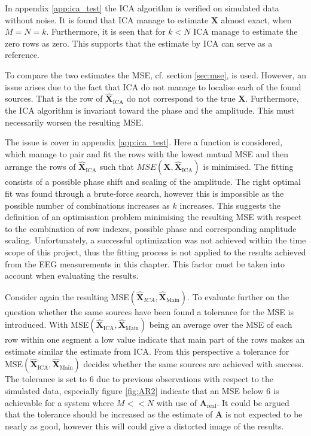 In appendix \ref{app:ica_test} the ICA algorithm is verified on simulated data without noise. 
It is found that ICA manage to estimate $\textbf{X}$ almost exact, when $M=N=k$. 
Furthermore, it is seen that for $k < N$ ICA manage to estimate the zero rows as zero. This supports that the estimate by ICA can serve as a reference.     

To compare the two estimates the MSE, cf. section \ref{sec:mse}, is used. 
However, an issue arises due to the fact that ICA do not manage to localise each of the found sources. 
That is the row of $\hat{\textbf{X}}_{\text{ICA}}$ do not correspond to the true $\textbf{X}$. 
Furthermore, the ICA algorithm is invariant toward the phase and the amplitude. This must necessarily worsen the resulting MSE.  

The issue is cover in appendix \ref{app:ica_test}. 
Here a function is considered, which manage to pair and fit the rows with the lowest mutual MSE and then arrange the rows of $\hat{\textbf{X}}_{\text{ICA}}$ such that $MSE(\textbf{X},\hat{\textbf{X}}_{\text{ICA}})$ is minimised. 
The fitting consists of a possible phase shift and scaling of the amplitude. 
The right optimal fit was found through a brute-force search, however this is impossible as the possible number of combinations increases as $k$ increases. 
This suggests the definition of an optimisation problem minimising the resulting MSE with respect to the combination of row indexes, possible phase and corresponding amplitude scaling. 
Unfortunately, a successful optimization was not achieved within the time scope of this project, thus the fitting process is not applied to the results achieved from the EEG measurements in this chapter. 
This factor must be taken into account when evaluating the results.

Consider again the resulting MSE$(\hat{\textbf{X}}_{ICA},\hat{\textbf{X}}_{\text{Main}})$. 
To evaluate further on the question whether the same sources have been found a tolerance for the MSE is introduced. 
With MSE$(\hat{\textbf{X}}_{\text{ICA}},\hat{\textbf{X}}_{\text{Main}})$ being an average over the MSE of each row within one segment a low value indicate that main part of the rows makes an estimate similar the estimate from ICA. 
From this perspective a tolerance for MSE$(\hat{\textbf{X}}_{\text{ICA}},\hat{\textbf{X}}_{\text{Main}})$ decides whether the same sources are achieved with success. 
The tolerance is set to 6 due to previous observations with respect to the simulated data, especially figure \ref{fig:AR2} indicate that an MSE below 6 is achievable for a system where $M<<N$ with use of $\textbf{A}_{\text{real}}$. 
It could be argued that the tolerance should be increased as the estimate of $\textbf{A}$ is not expected to be nearly as good, however this will could give a distorted image of the results.          

